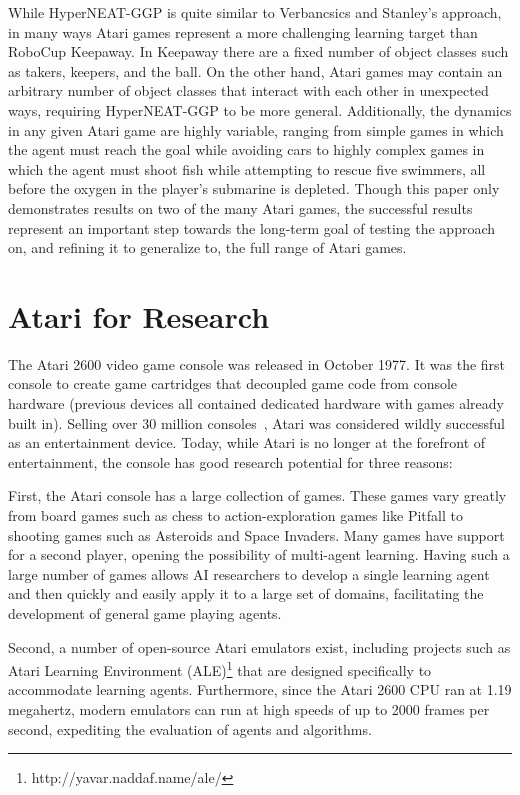 \documentclass{sig-alternate}
\begin{document}
While HyperNEAT-GGP is quite similar to Verbancsics and Stanley's approach, in many ways Atari games represent a more challenging learning target than RoboCup Keepaway. In Keepaway there are a fixed number of object classes such as takers, keepers, and the ball. On the other hand, Atari games may contain an arbitrary number of object classes that interact with each other in unexpected ways, requiring HyperNEAT-GGP to be more general. Additionally, the dynamics in any given Atari game are highly variable, ranging from simple games in which the agent must reach the goal while avoiding cars to highly complex games in which the agent must shoot fish while attempting to rescue five swimmers, all before the oxygen in the player's submarine is depleted. Though this paper only demonstrates results on two of the many Atari games, the successful results represent an important step towards the long-term goal of testing the approach on, and refining it to generalize to, the full range of Atari games.

\section{Atari for Research}
\label{sec:atari}
The Atari 2600 video game console was released in October 1977. It was the first console to create game cartridges that decoupled game code from console hardware (previous devices all contained dedicated hardware with games already built in). Selling over 30 million consoles~\cite{atarihist}, Atari was considered wildly successful as an entertainment device. Today, while Atari is no longer at the forefront of entertainment, the console has good research potential for three reasons:

First, the Atari console has a large collection of games. These games vary greatly from board games such as chess to action-exploration games like Pitfall to shooting games such as Asteroids and Space Invaders. Many games have support for a second player, opening the possibility of multi-agent learning. Having such a large number of games allows AI researchers to develop a single learning agent and then quickly and easily apply it to a large set of domains, facilitating the development of general game playing agents.

Second, a number of open-source Atari emulators exist, including projects such as Atari Learning Environment (ALE)\footnote{http://yavar.naddaf.name/ale/} that are designed specifically to accommodate learning agents. Furthermore, since the Atari 2600 CPU ran at 1.19 megahertz, modern emulators can run at high speeds of up to 2000 frames per second, expediting the evaluation of agents and algorithms.
\end{document}
